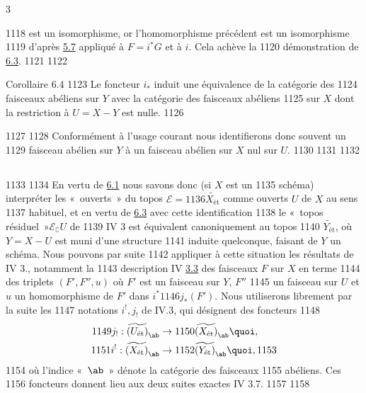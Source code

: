 3	\documentclass[10pt]{../fichiers-configuration-latex/smfart}
\begin{document}
  1118	est un isomorphisme, or l'homomorphisme précédent est un isomorphisme
  1119	d'après \hyperref[VIII.cor5.7]{5.7} appliqué à $F = i^{\ast} G$ et à $i$. Cela achève la
  1120	démonstration de \hyperref[VIII.thm6.3]{6.3}.
  1121	
  1122	\begin{enonce*}{Corollaire 6.4}
  1123	Le foncteur $i_{\ast}$ induit une équivalence de la catégorie des
  1124	faisceaux abéliens sur $Y$ avec la catégorie des faisceaux abéliens
  1125	sur $X$ dont la restriction à $U = X - Y$ est nulle.
  1126	\end{enonce*}
  1127	
  1128	Conformément à l'usage courant nous identifierons donc souvent un
  1129	faisceau abélien sur $Y$  à un faisceau abélien sur $X$ nul sur $U$.
  1130	
  1131	\setcounter{subsection}{4}
  1132	\subsection{}
  1133	
  1134	En vertu de \hyperref[VIII.prop6.1]{6.1} nous savons donc (si $X$ est un
  1135	schéma) interpréter les « ouverts » du topos $ℰ =
  1136	\widetilde{X_{\text{ét}}}$ comme ouverts $U$ de $X$ au sens
  1137	habituel, et en vertu de \hyperref[VIII.thm6.3]{6.3} avec cette identification
  1138	le « topos résiduel »\pageoriginale $ℰ_\complement U$ de
  1139	IV 3 est équivalent canoniquement au topos
  1140	$\widetilde{Y_{\text{ét}}}$, où $Y = X - U$ est muni d'une structure
  1141	induite quelconque, faisant de $Y$ un schéma. Nous pouvons par suite
  1142	appliquer à cette situation les résultats de IV 3., notamment la
  1143	description IV \hyperref[VIII.def3.3]{3.3} des faisceaux $F$ sur $X$ en terme
  1144	des triplets $(F', F'', u)$ où $F'$ est un faisceau sur $Y$, $F''$
  1145	un faisceau sur $U$ et $u$ un homomorphisme de $F'$ dans $i^{\ast}
  1146	j_{\ast} (F')$. Nous utiliserons librement par la suite les
  1147	notations $i^{!}, j_{!}$ de IV.3, qui désignent des foncteurs
  1148	\begin{align*}
  1149	j_{!} : \widetilde{(U_{\text{ét}})}_{\ab} &\to
  1150	\widetilde{(X_{\text{ét}})}_{\ab}{\quoi},\\
  1151	i^{!} : \widetilde{(X_{\text{ét}})}_{\ab} &\to
  1152	\widetilde{(Y_{\text{ét}})}_{\ab}{\quoi},
  1153	\end{align*}
  1154	où l'indice « $\ab$ » dénote la catégorie des faisceaux
  1155	abéliens. Ces
  1156	foncteurs donnent lieu aux deux suites exactes IV 3.7.
  1157	
  1158	\subsection{}
\end{document}
